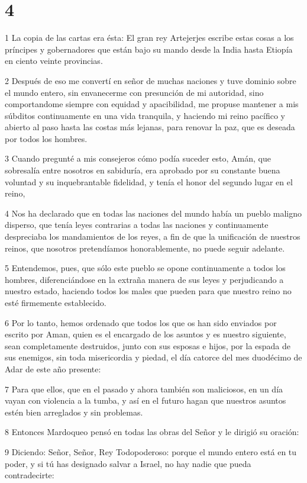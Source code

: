 \chapter{4}

\par 1 La copia de las cartas era ésta: El gran rey Artejerjes escribe estas cosas a los príncipes y gobernadores que están bajo su mando desde la India hasta Etiopía en ciento veinte provincias.
\par 2 Después de eso me convertí en señor de muchas naciones y tuve dominio sobre el mundo entero, sin envanecerme con presunción de mi autoridad, sino comportandome siempre con equidad y apacibilidad, me propuse mantener a mis súbditos continuamente en una vida tranquila, y haciendo mi reino pacífico y abierto al paso hasta las costas más lejanas, para renovar la paz, que es deseada por todos los hombres.
\par 3 Cuando pregunté a mis consejeros cómo podía suceder esto, Amán, que sobresalía entre nosotros en sabiduría, era aprobado por su constante buena voluntad y su inquebrantable fidelidad, y tenía el honor del segundo lugar en el reino,
\par 4 Nos ha declarado que en todas las naciones del mundo había un pueblo maligno disperso, que tenía leyes contrarias a todas las naciones y continuamente despreciaba los mandamientos de los reyes, a fin de que la unificación de nuestros reinos, que nosotros pretendíamos honorablemente, no puede seguir adelante.
\par 5 Entendemos, pues, que sólo este pueblo se opone continuamente a todos los hombres, diferenciándose en la extraña manera de sus leyes y perjudicando a nuestro estado, haciendo todos los males que pueden para que nuestro reino no esté firmemente establecido.
\par 6 Por lo tanto, hemos ordenado que todos los que os han sido enviados por escrito por Aman, quien es el encargado de los asuntos y es nuestro siguiente, sean completamente destruidos, junto con sus esposas e hijos, por la espada de sus enemigos, sin toda misericordia y piedad, el día catorce del mes duodécimo de Adar de este año presente:
\par 7 Para que ellos, que en el pasado y ahora también son maliciosos, en un día vayan con violencia a la tumba, y así en el futuro hagan que nuestros asuntos estén bien arreglados y sin problemas.
\par 8 Entonces Mardoqueo pensó en todas las obras del Señor y le dirigió su oración:
\par 9 Diciendo: Señor, Señor, Rey Todopoderoso: porque el mundo entero está en tu poder, y si tú has designado salvar a Israel, no hay nadie que pueda contradecirte:
